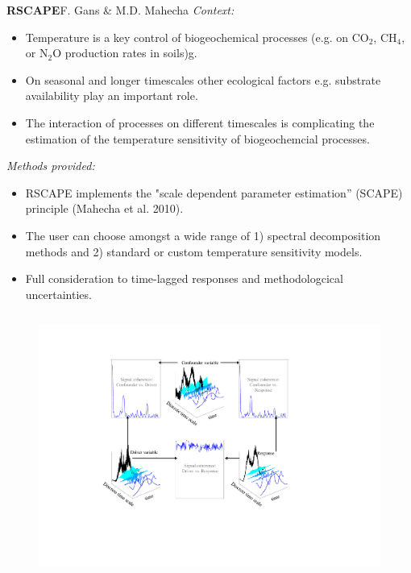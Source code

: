 \begin{columns}
\begin{column}{.48\textwidth}
\begin{center}
\begin{minipage}[T]{.95\textwidth}
{\begin{block}{\textbf{RSCAPE}\hfill\normalsize{F. Gans \& M.D. Mahecha}}
\alert{\textit{Context:}}
\begin{itemize}
	\item Temperature is a key control of biogeochemical processes (e.g. on CO$_2$, CH$_4$, or N$_2$O production rates in soils)g.
	\item On seasonal and longer timescales other ecological factors e.g. substrate availability play an important role.
	\item The interaction of processes on different timescales is complicating the estimation of the temperature sensitivity of biogeochemcial processes.
\end{itemize}
 
\alert{\textit{Methods provided:}}
\begin{itemize}
	\item RSCAPE implements the "scale dependent parameter estimation” (SCAPE) principle (Mahecha et al. 2010).
    \item The user can choose amongst a wide range of 1) spectral decomposition methods and 2) standard or custom temperature sensitivity models.
    \item Full consideration to time-lagged responses and methodologcical uncertainties.
\end{itemize}
\vspace{1cm}
\begin{columns}
	\begin{figure}[tb]
	\begin{center}
		\includegraphics[width=.95\textwidth]{images/content/FIG1.pdf}
	\end{center}

\end{figure}
\end{columns}
\end{block}}
\end{minipage}
\end{center}
\end{column}
\end{columns}
